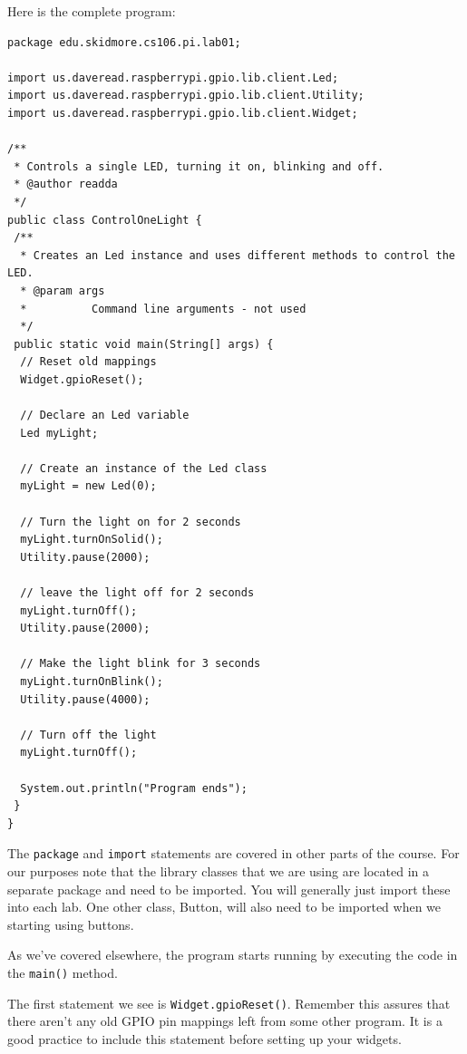 Here is the complete program:

\beforeverb
\begin{verbatim}
package edu.skidmore.cs106.pi.lab01;

import us.daveread.raspberrypi.gpio.lib.client.Led;
import us.daveread.raspberrypi.gpio.lib.client.Utility;
import us.daveread.raspberrypi.gpio.lib.client.Widget;

/**
 * Controls a single LED, turning it on, blinking and off.
 * @author readda
 */
public class ControlOneLight {
 /**
  * Creates an Led instance and uses different methods to control the LED.
  * @param args
  *          Command line arguments - not used
  */
 public static void main(String[] args) {
  // Reset old mappings
  Widget.gpioReset();

  // Declare an Led variable
  Led myLight;

  // Create an instance of the Led class
  myLight = new Led(0);

  // Turn the light on for 2 seconds
  myLight.turnOnSolid();
  Utility.pause(2000);

  // leave the light off for 2 seconds
  myLight.turnOff();
  Utility.pause(2000);

  // Make the light blink for 3 seconds
  myLight.turnOnBlink();
  Utility.pause(4000);

  // Turn off the light
  myLight.turnOff();

  System.out.println("Program ends");
 }
}
\end{verbatim}
\afterverb

The \texttt{package} and \texttt{import} statements are covered in other parts of the course. For our purposes note that the library classes that we are using are located in a separate package and need to be imported. You will generally just import these into each lab. One other class, Button, will also need to be imported when we starting using buttons.

As we've covered elsewhere, the program starts running by executing the code in the \texttt{main()} method.

The first statement we see is \texttt{Widget.gpioReset()}. Remember this assures that there aren't any old GPIO pin mappings left from some other program. It is a good practice to include this statement before setting up your widgets.


